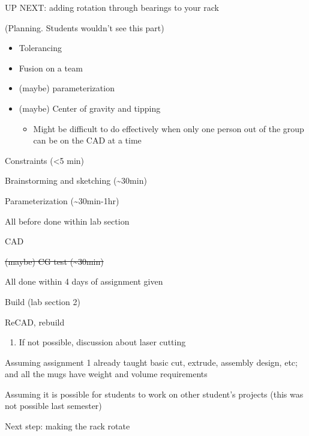 \documentclass[11pt,letterpaper]{article}
\begin{document}
\medskip
UP NEXT: adding rotation through bearings to your rack

\newpage
\begingroup
(Planning. Students wouldn't see this part)

\begin{itemize}
  \item Tolerancing
  \item Fusion on a team
  \item (maybe) parameterization
  \item (maybe) Center of gravity and tipping
  \begin{itemize}
    \item Might be difficult to do effectively when only one person out of the group can be on the CAD at a time
  \end{itemize}
\end{itemize}
\begin{AssignmentSteps}
  \item Constraints (\textless5 min)
  \item Brainstorming and sketching (\textasciitilde30min)
  \item Parameterization (\textasciitilde30min-1hr)
\end{AssignmentSteps}
All before done within lab section
\begin{AssignmentSteps}[start=4]
  \item CAD
  \item[\sout{5.}] \sout{(maybe) CG test (\textasciitilde30min)}
\end{AssignmentSteps}
All done within 4 days of assignment given
\begin{AssignmentSteps}[start=6]
  \item Build (lab section 2)
  \item ReCAD, rebuild
  \begin{enumerate}[label=\alph*.]
    \item If not possible, discussion about laser cutting
  \end{enumerate}
\end{AssignmentSteps}

\medskip
Assuming assignment 1 already taught basic cut, extrude, assembly design, etc; and all the mugs have weight and volume requirements

Assuming it is possible for students to work on other student's projects (this was not possible last semester)

\medskip
Next step: making the rack rotate
\par
\endgroup
\end{document}
